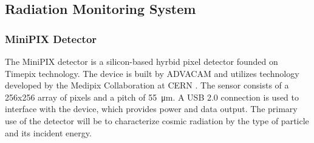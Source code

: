 \subsection{Radiation Monitoring System}
\label{sec:RadiationDesign}

\subsubsection{MiniPIX Detector}
The MiniPIX detector is a silicon-based hyrbid pixel detector founded on Timepix technology. The device is built by ADVACAM \cite{Advacam}  and utilizes technology developed by the Medipix Collaboration at CERN \cite{Medipix}. The sensor consists of a \num{256}x\num{256} array of pixels and a pitch of \SI{55}{\micro\meter}. A USB 2.0 connection is used to interface with the device, which provides power and data output. The primary use of the detector will be to characterize cosmic radiation by the type of particle and its incident energy.

